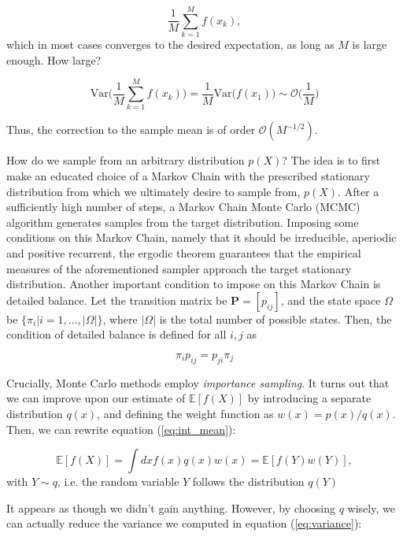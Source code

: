\documentclass[10pt, twocolumn, twoside]{article}
\begin{document}
\begin{equation}
\frac{1}{M} \sum_{k=1}^M f (x_k) , 
\end{equation}
which in most cases converges to the desired expectation, as long as $M$ is large enough. How large?

\begin{equation}\label{eq:variance}
\text{Var}\bigg( \frac{1}{M} \sum_{k=1}^M f(x_k) \bigg) = \frac{1}{M} \text{Var}\bigg( f(x_1) \bigg) \sim \mathcal{O}\bigg(\frac{1}{M}\bigg)
\end{equation}

Thus, the correction to the sample mean is of order $\mathcal{O}(M^{-1/2})$.

How do we sample from an arbitrary distribution $p(X)$? The idea is to first make an educated choice of a Markov Chain with the prescribed stationary distribution from which we ultimately desire to sample from, $p(X)$. After a sufficiently high number of steps, a Markov Chain Monte Carlo (MCMC) algorithm generates samples from the target distribution. Imposing some conditions on this Markov Chain, namely that it should be irreducible, aperiodic and positive recurrent, the ergodic theorem guarantees that the empirical measures of the aforementioned sampler approach the target stationary distribution. Another important condition to impose on this Markov Chain is detailed balance. Let the transition matrix be $\bm P = [p_{ij}]$, and the state space $\Omega$ be $\{\pi_i | i=1, ..., |\Omega| \}$, where $|\Omega|$ is the total number of possible states. Then, the condition of detailed balance is defined for all $i, j$ as

\begin{equation}
\pi_i p_{ij} = p_{ji} \pi_j 
\end{equation}

Crucially, Monte Carlo methods employ \emph{importance sampling}. It turns out that we can improve upon our estimate of $\mathbb{E} [f(X)]$ by introducing a separate distribution $q(x)$, and defining the weight function as $w(x) = p(x)/ q(x)$. Then, we can rewrite equation (\ref{eq:int_mean}):

\begin{equation}
\mathbb{E} [f(X)] = \int dx f(x) q(x) w(x) = \mathbb{E} [f(Y) w(Y)],
\end{equation}
with $Y \sim q$, i.e. the random variable $Y$ follows the distribution $q(Y)$

It appears as though we didn't gain anything. However, by choosing $q$ wisely, we can actually reduce the variance we computed in equation (\ref{eq:variance}):
\end{document}
